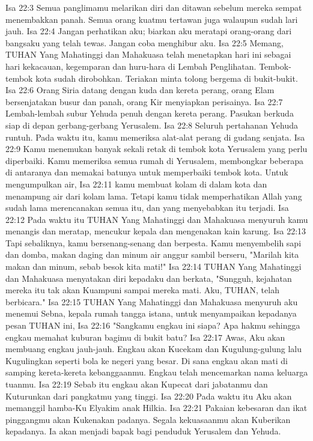 Isa 22:3  Semua panglimamu melarikan diri dan ditawan sebelum mereka sempat menembakkan panah. Semua orang kuatmu tertawan juga walaupun sudah lari jauh.
Isa 22:4  Jangan perhatikan aku; biarkan aku meratapi orang-orang dari bangsaku yang telah tewas. Jangan coba menghibur aku.
Isa 22:5  Memang, TUHAN Yang Mahatinggi dan Mahakuasa telah menetapkan hari ini sebagai hari kekacauan, kegemparan dan huru-hara di Lembah Penglihatan. Tembok-tembok kota sudah dirobohkan. Teriakan minta tolong bergema di bukit-bukit.
Isa 22:6  Orang Siria datang dengan kuda dan kereta perang, orang Elam bersenjatakan busur dan panah, orang Kir menyiapkan perisainya.
Isa 22:7  Lembah-lembah subur Yehuda penuh dengan kereta perang. Pasukan berkuda siap di depan gerbang-gerbang Yerusalem.
Isa 22:8  Seluruh pertahanan Yehuda runtuh. Pada waktu itu, kamu memeriksa alat-alat perang di gudang senjata.
Isa 22:9  Kamu menemukan banyak sekali retak di tembok kota Yerusalem yang perlu diperbaiki. Kamu memeriksa semua rumah di Yerusalem, membongkar beberapa di antaranya dan memakai batunya untuk memperbaiki tembok kota. Untuk mengumpulkan air,
Isa 22:11  kamu membuat kolam di dalam kota dan menampung air dari kolam lama. Tetapi kamu tidak memperhatikan Allah yang sudah lama merencanakan semua itu, dan yang menyebabkan itu terjadi.
Isa 22:12  Pada waktu itu TUHAN Yang Mahatinggi dan Mahakuasa menyuruh kamu menangis dan meratap, mencukur kepala dan mengenakan kain karung.
Isa 22:13  Tapi sebaliknya, kamu bersenang-senang dan berpesta. Kamu menyembelih sapi dan domba, makan daging dan minum air anggur sambil berseru, "Marilah kita makan dan minum, sebab besok kita mati!"
Isa 22:14  TUHAN Yang Mahatinggi dan Mahakuasa menyatakan diri kepadaku dan berkata, "Sungguh, kejahatan mereka itu tak akan Kuampuni sampai mereka mati. Aku, TUHAN, telah berbicara."
Isa 22:15  TUHAN Yang Mahatinggi dan Mahakuasa menyuruh aku menemui Sebna, kepala rumah tangga istana, untuk menyampaikan kepadanya pesan TUHAN ini,
Isa 22:16  "Sangkamu engkau ini siapa? Apa hakmu sehingga engkau memahat kuburan bagimu di bukit batu?
Isa 22:17  Awas, Aku akan membuang engkau jauh-jauh. Engkau akan Kucekam dan Kugulung-gulung lalu Kugulingkan seperti bola ke negeri yang besar. Di sana engkau akan mati di samping kereta-kereta kebanggaanmu. Engkau telah mencemarkan nama keluarga tuanmu.
Isa 22:19  Sebab itu engkau akan Kupecat dari jabatanmu dan Kuturunkan dari pangkatmu yang tinggi.
Isa 22:20  Pada waktu itu Aku akan memanggil hamba-Ku Elyakim anak Hilkia.
Isa 22:21  Pakaian kebesaran dan ikat pinggangmu akan Kukenakan padanya. Segala kekuasaanmu akan Kuberikan kepadanya. Ia akan menjadi bapak bagi penduduk Yerusalem dan Yehuda.
